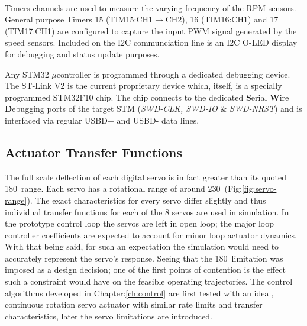 \\
Timers channels are used to measure the varying frequency of the RPM sensors. General purpose Timers 15 (TIM15:CH1$\rightarrow$CH2), 16 (TIM16:CH1) and 17 (TIM17:CH1) are configured to capture the input PWM signal generated by the speed sensors. Included on the I2C communciation line is an I2C O-LED display for debugging and status update purposes.
\par
Any STM32 $\mu$controller is programmed through a dedicated debugging device. The ST-Link V2\cite{st-link} is the current proprietary device which, itself, is a specially programmed STM32F10 chip. The chip connects to the dedicated \textbf{S}erial \textbf{W}ire \textbf{D}ebugging ports of the target STM (\emph{SWD-CLK, SWD-IO} \& \emph{SWD-NRST}) and is interfaced via regular USBD+ and USBD- data lines. 
\subsection{Actuator Transfer Functions}
\label{subsec:proto.design.transfer}
The full scale deflection of each digital servo is in fact greater than its quoted 180\textdegree ~range. Each servo has a rotational range of around 230\textdegree ~(Fig:\ref{fig:servo-range}). The exact characteristics for every servo differ slightly and thus individual transfer functions for each of the 8 servos are used in simulation. In the prototype control loop the servos are left in open loop; the major loop controller coefficients are expected to account for minor loop actuator dynamics. With that being said, for such an expectation the simulation would need to accurately represent the servo's response. Seeing that the 180\textdegree ~limitation was imposed as a design decision; one of the first points of contention is the effect such a constraint would have on the feasible operating trajectories. The control algorithms developed in Chapter:\ref{ch:control} are first tested with an ideal, continuous rotation servo actuator with similar rate limits and transfer characteristics, later the servo limitations are introduced.
